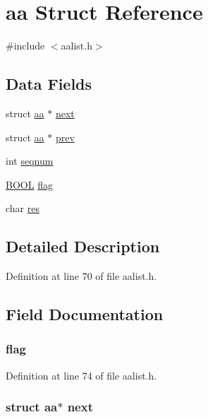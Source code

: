 \hypertarget{structaa}{\section{aa Struct Reference}
\label{structaa}
}


{\ttfamily \#include $<$aalist.\-h$>$}

\subsection*{Data Fields}
\begin{DoxyCompactItemize}
\item 
struct \hyperlink{structaa}{aa} $\ast$ \hyperlink{structaa_afcb55b9b232ba301f88f1cc4c40edb83}{next}
\item 
struct \hyperlink{structaa}{aa} $\ast$ \hyperlink{structaa_addb71ee233c0a2d03f6fd3b2cc24f9e4}{prev}
\item 
int \hyperlink{structaa_a54d0bde7289ee46d2643ee7c676635b3}{seqnum}
\item 
\hyperlink{_sys_defs_8h_a2df9d82ef74025dde989a5ae3edc886c}{B\-O\-O\-L} \hyperlink{structaa_aff1eaa4daf969238aca5cc815ea7843c}{flag}
\item 
char \hyperlink{structaa_a7b47a2f568f2f7b30337241f588e8845}{res}
\end{DoxyCompactItemize}


\subsection{Detailed Description}


Definition at line 70 of file aalist.\-h.



\subsection{Field Documentation}
\hypertarget{structaa_aff1eaa4daf969238aca5cc815ea7843c}{
\subsubsection[{flag}]{ flag}}\label{structaa_aff1eaa4daf969238aca5cc815ea7843c}


Definition at line 74 of file aalist.\-h.

\hypertarget{structaa_afcb55b9b232ba301f88f1cc4c40edb83}{
\subsubsection[{next}]{\setlength{\rightskip}{0pt plus 5cm}struct {\bf aa}$\ast$ next}}\label{structaa_afcb55b9b232ba301f88f1cc4c40edb83}


